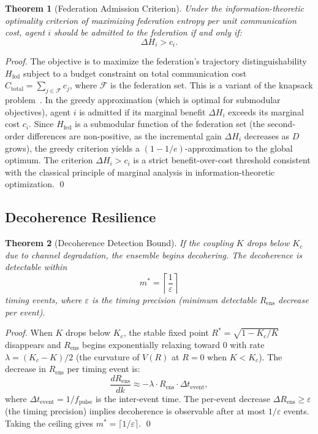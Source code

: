 \documentclass[twocolumn,10pt]{article}
\newtheorem{theorem}{Theorem}[section]
\newcommand{\Rens}{R_{\mathrm{ens}}}
\newcommand{\Kc}{K_c}
\begin{document}
\begin{theorem}[Federation Admission Criterion]
\label{thm:admission}
Under the information-theoretic optimality criterion of maximizing federation
entropy per unit communication cost, agent $i$ should be admitted to the
federation if and only if:
\begin{equation}
\label{eq:admission}
  \Delta H_i > c_i.
\end{equation}
\end{theorem}

\begin{proof}
The objective is to maximize the federation's trajectory distinguishability
$H_{\mathrm{fed}}$ subject to a budget constraint on total communication cost
$C_{\mathrm{total}} = \sum_{j \in \mathcal{F}} c_j$, where $\mathcal{F}$ is
the federation set. This is a variant of the knapsack problem~\cite{Cover2006}.
In the greedy approximation (which is optimal for submodular objectives),
agent $i$ is admitted if its marginal benefit $\Delta H_i$ exceeds its
marginal cost $c_i$. Since $H_{\mathrm{fed}}$ is a submodular function of
the federation set (the second-order differences are non-positive, as the
incremental gain $\Delta H_i$ decreases as $D$ grows), the greedy criterion
yields a $(1 - 1/e)$-approximation to the global optimum. The criterion
$\Delta H_i > c_i$ is a strict benefit-over-cost threshold consistent with
the classical principle of marginal analysis in information-theoretic
optimization. \qed
\end{proof}

\subsection{Decoherence Resilience}

\begin{theorem}[Decoherence Detection Bound]
\label{thm:decoherence}
If the coupling $K$ drops below $\Kc$ due to channel degradation, the ensemble
begins decohering. The decoherence is detectable within
\begin{equation}
\label{eq:detect_bound}
  m^* = \left\lceil \frac{1}{\varepsilon} \right\rceil
\end{equation}
timing events, where $\varepsilon$ is the timing precision (minimum detectable
$\Rens$ decrease per event).
\end{theorem}

\begin{proof}
When $K$ drops below $\Kc$, the stable fixed point $R^* = \sqrt{1-\Kc/K}$
disappears and $\Rens$ begins exponentially relaxing toward 0 with rate
$\lambda = (\Kc - K)/2$ (the curvature of $V(R)$ at $R = 0$ when
$K < \Kc$). The decrease in $\Rens$ per timing event is:
\[
  \frac{d\Rens}{dk} \approx -\lambda \cdot \Rens \cdot \Delta t_{\mathrm{event}},
\]
where $\Delta t_{\mathrm{event}} = 1/f_{\mathrm{pulse}}$ is the inter-event
time. The per-event decrease $\Delta\Rens \geq \varepsilon$ (the timing
precision) implies decoherence is observable after at most $1/\varepsilon$
events. Taking the ceiling gives $m^* = \lceil 1/\varepsilon \rceil$. \qed
\end{proof}
\end{document}
